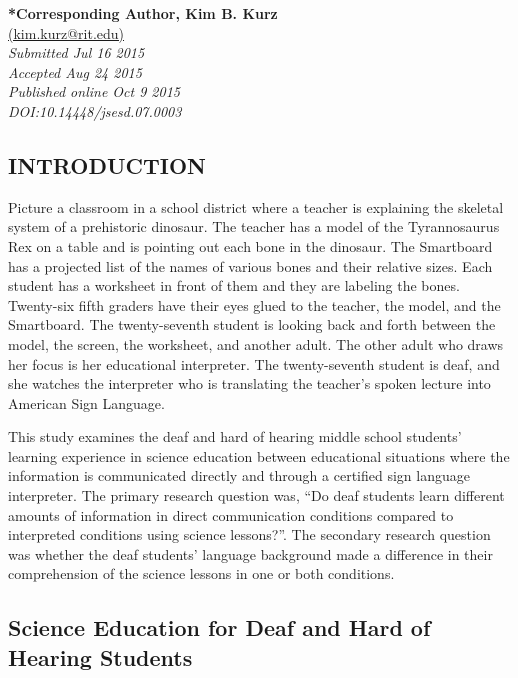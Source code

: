 \documentclass[11.5pt]{sig-alternate} %
\begin{document}
\textbf{*Corresponding Author, Kim B. Kurz}\\
\href{mailto:  kim.kurz@rit.edu}{(kim.kurz@rit.edu)} \\
\textit{Submitted Jul 16 2015 }\\
\textit{Accepted Aug 24 2015} \\
\textit{Published online  Oct 9 2015} \\
\textit{DOI:10.14448/jsesd.07.0003} \\
\pagebreak
\clearpage
\begin{large}
\section*{INTRODUCTION}
    
Picture a classroom in a school district where a teacher is explaining the skeletal system of a prehistoric dinosaur. The teacher has a model of the Tyrannosaurus Rex on a table and is pointing out each bone in the dinosaur. The Smartboard has a projected list of the names of various bones and their relative sizes. Each student has a worksheet in front of them and they are labeling the bones. Twenty-six fifth graders have their eyes glued to the teacher, the model, and the Smartboard. The twenty-seventh student is looking back and forth between the model, the screen, the worksheet, and another adult. The other adult who draws her focus is her educational interpreter. The twenty-seventh student is deaf, and she watches the interpreter who is translating the teacher’s spoken lecture into American Sign Language.

This study examines the deaf and hard of hearing middle school students’ learning experience in science education between educational situations where the information is communicated directly and through a certified sign language interpreter. The primary research question was, “Do deaf students learn different amounts of information in direct communication conditions compared to interpreted conditions using science lessons?”. The secondary research question was whether the deaf students’ language background made a difference in their comprehension of the science lessons in one or both conditions.

\subsection*{Science Education for Deaf and Hard of Hearing Students}


\end{large}
\end{document}
